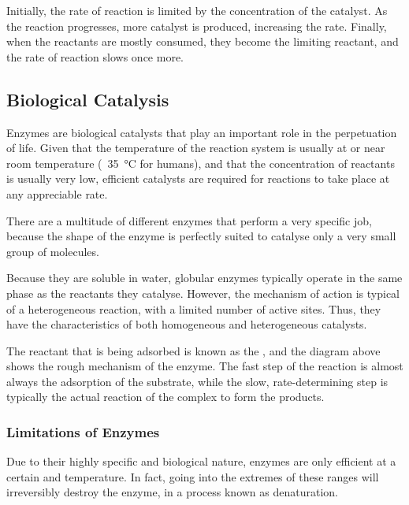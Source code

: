 			Initially, the rate of reaction is limited by the concentration of the catalyst. As the reaction progresses, more catalyst
			is produced, increasing the rate. Finally, when the reactants are mostly consumed, they become the limiting reactant, and the
			rate of reaction slows once more.




		\subsection{Biological Catalysis}
			Enzymes are biological catalysts that play an important role in the perpetuation of life. Given that the temperature of the
			reaction system is usually at or near room temperature (~\SI{35}{\celsius} for humans), and that the concentration of reactants
			is usually very low, efficient catalysts are required for reactions to take place at any appreciable rate.

			There are a multitude of different enzymes that perform a very specific job, because the shape of the enzyme is perfectly suited
			to catalyse only a very small group of molecules.

			Because they are soluble in water, globular enzymes typically operate in the same phase as the reactants they catalyse. However, the
			mechanism of action is typical of a heterogeneous reaction, with a limited number of active sites. Thus, they have the characteristics
			of both homogeneous and heterogeneous catalysts.


			The reactant that is being adsorbed is known as the , and the diagram above shows the rough mechanism of the
			enzyme. The fast step of the reaction is almost always the adsorption of the substrate, while the slow, rate-determining step is
			typically the actual reaction of the complex to form the products.


			\subsubsection{Limitations of Enzymes}

				Due to their highly specific and biological nature, enzymes are only efficient at a certain \pH and temperature. In fact,
				going into the extremes of these ranges will irreversibly destroy the enzyme, in a process known as denaturation.

